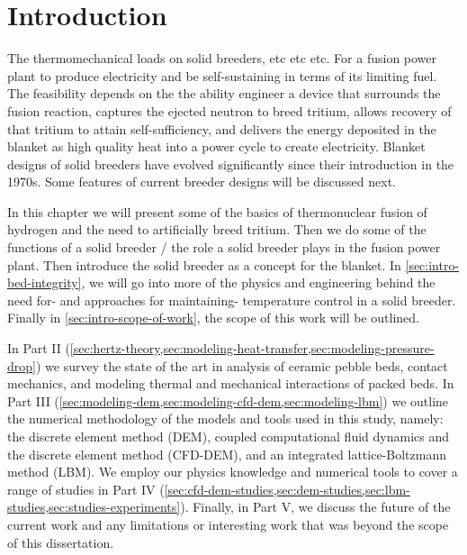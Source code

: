 \chapter{Introduction} \label{sec:introduction}
The thermomechanical loads on solid breeders, etc etc etc. For a fusion power plant to produce electricity and be self-sustaining in terms of its limiting fuel. The feasibility depends on the the ability engineer a device that surrounds the fusion reaction, captures the ejected neutron to breed tritium, allows recovery of that tritium to attain self-sufficiency, and delivers the energy deposited in the blanket as high quality heat into a power cycle to create electricity. Blanket designs of solid breeders have evolved significantly since their introduction in the 1970s. Some features of current breeder designs will be discussed next.

In this chapter we will present some of the basics of thermonuclear fusion of hydrogen and the need to artificially breed tritium.  Then we do some of the functions of a solid breeder / the role a solid breeder plays in the fusion power plant. Then introduce the solid breeder as a concept for the blanket. In \cref{sec:intro-bed-integrity}, we will go into more of the physics and engineering behind the need for- and approaches for maintaining- temperature control in a solid breeder. Finally in \cref{sec:intro-scope-of-work}, the scope of this work will be outlined.











In Part II (\cref{sec:hertz-theory,sec:modeling-heat-transfer,sec:modeling-pressure-drop}) we survey the state of the art in analysis of ceramic pebble beds, contact mechanics, and modeling thermal and mechanical interactions of packed beds.  In Part III (\cref{sec:modeling-dem,sec:modeling-cfd-dem,sec:modeling-lbm}) we outline the numerical methodology of the models and tools used in this study, namely: the discrete element method (DEM), coupled computational fluid dynamics and the discrete element method (CFD-DEM), and an integrated lattice-Boltzmann method (LBM). We employ our physics knowledge and numerical tools to cover a range of studies in Part IV (\cref{sec:cfd-dem-studies,sec:dem-studies,sec:lbm-studies,sec:studies-experiments}). Finally, in Part V, we discuss the future of the current work and any limitations or interesting work that was beyond the scope of this dissertation.